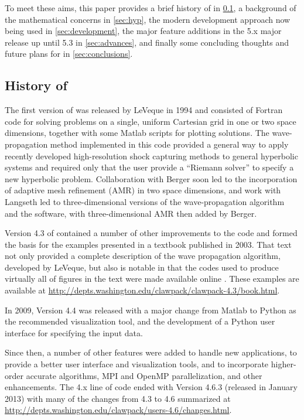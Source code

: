 To meet these aims, this paper provides a brief history of \clawpack in
\cref{sub:history}, a background of the mathematical concerns in \cref{sec:hyp},
the modern development approach now being used in \cref{sec:development},
the major feature additions in the \clawpack 5.x major release up until 5.3 in
\cref{sec:advances}, and finally some concluding thoughts and future plans for
\clawpack in
\cref{sec:conclusions}.

\subsection{History of \clawpack} \label{sub:history}

The first version of \clawpack was released by LeVeque in 1994
\cite{clawpack-v1} and consisted of Fortran code for solving problems on a
single, uniform Cartesian
grid in one or two space dimensions, together with some Matlab
\cite{MATLAB:2015a} scripts
for plotting solutions. The wave-propagation method implemented
in this code provided a general way to apply recently developed
high-resolution shock capturing methods to general hyperbolic systems and
required only that the user provide a ``Riemann solver'' to specify a new
hyperbolic problem.
Collaboration with Berger \cite{mjb-rjl:amrclaw}
soon led to the incorporation of adaptive mesh refinement (AMR) in two space
dimensions, and work with Langseth \cite{jol-rjl:3d, jol:thesis}
led to three-dimensional versions of the wave-propagation algorithm and the
software, with three-dimensional AMR then added by Berger.

Version 4.3 of \clawpack contained a number of other improvements to
the code and formed the basis for the examples presented in a textbook
\cite{rjl:fvmhp} published in 2003.  That text not only provided a
complete description of the wave propagation algorithm, developed by LeVeque,
but also is notable in that the codes used to produce virtually all of figures
in the text were made available online \cite{rjl:fvmhp}.  These examples are
available at \url{http://depts.washington.edu/clawpack/clawpack-4.3/book.html}.

In 2009, \clawpack Version 4.4 was released with a major change from Matlab
to Python as the recommended visualization tool, and the development
of a Python user interface for specifying the input data.

Since then, a number of other features were added to handle new
applications, to provide a better user interface and visualization tools, and to
incorporate higher-order accurate algorithms, MPI and OpenMP parallelization, and
other enhancements. The \clawpack 4.x line of code ended with Version 4.6.3
(released in January 2013) with many of the changes from 4.3 to 4.6 summarized at
\url{http://depts.washington.edu/clawpack/users-4.6/changes.html}.

